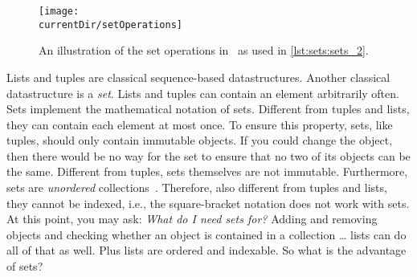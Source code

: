 %
\label{sec:sets}%
%
%
%
%
%
%
%
\begin{figure}%
\centering%
\texttt{[image: \\currentDir/setOperations]}%
\caption{An illustration of the set operations in \python\ as used in \cref{lst:sets:sets_2}.}%
\label{fig:setOperations}%
\end{figure}%
%
Lists and tuples are classical sequence-based datastructures.
Another classical datastructure is a \emph{set}.
Lists and tuples can contain an element arbitrarily often.
Sets implement the mathematical notation of sets.
Different from tuples and lists, they can contain each element at most once.
To ensure this property, sets, like tuples, should only contain immutable objects.
If you could change the object, then there would be no way for the set to ensure that no two of its objects can be the same.%
%
%
%
Different from tuples, sets themselves are not immutable.
Furthermore, sets are \emph{unordered} collections~\cite{PSF:P3D:TPSL:STSF}.
Therefore, also different from tuples and lists, they cannot be indexed, i.e., the square-bracket notation does not work with sets.%
%
%
%
At this point, you may ask:
\emph{What do I need sets for?}
Adding and removing objects and checking whether an object is contained in a collection {\dots} lists can do all of that as well.
Plus lists are ordered and indexable.
So what is the advantage of sets?

